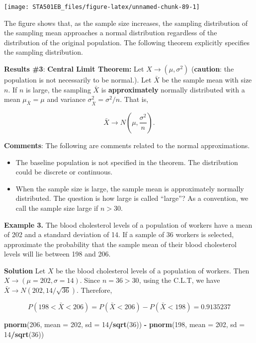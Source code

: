 \documentclass[
]{book}
\newenvironment{Shaded}{\begin{snugshade}}{\end{snugshade}}
\newcommand{\AttributeTok}[1]{\textcolor[rgb]{0.13,0.29,0.53}{#1}}
\newcommand{\DecValTok}[1]{\textcolor[rgb]{0.00,0.00,0.81}{#1}}
\newcommand{\FunctionTok}[1]{\textcolor[rgb]{0.13,0.29,0.53}{\textbf{#1}}}
\newcommand{\NormalTok}[1]{#1}
\newcommand{\SpecialCharTok}[1]{\textcolor[rgb]{0.81,0.36,0.00}{\textbf{#1}}}
\begin{document}
\begin{center}\texttt{[image: STA501EB\_files/figure-latex/unnamed-chunk-89-1]} \end{center}

The figure shows that, as the sample size increases, the sampling distribution of the sampling mean approaches a normal distribution regardless of the distribution of the original population. The following theorem explicitly specifies the sampling distribution.

\textbf{Results \#3}: \textbf{Central Limit Theorem:} Let \(X \to (\mu, \sigma^2)\) (\textbf{caution}: the population is not necessarily to be normal.). Let \(\bar{X}\) be the sample mean with size \(n\). If \(n\) is large, the sampling \(\bar{X}\) is \textbf{approximately} normally distributed with a mean \(\mu_{\bar{X}} = \mu\) and variance \(\sigma_{\bar{X}}^2 = \sigma^2/n\). That is,

\[
\bar{X} \to N\left( \mu, \frac{\sigma^2}{n} \right).
\]

\textbf{Comments}: The following are comments related to the normal approximations.

\begin{itemize}
\item
  The baseline population is not specified in the theorem. The distribution could be discrete or continuous.
\item
  When the sample size is large, the sample mean is approximately normally distributed. The question is how large is called ``large''? As a convention, we call the sample size large if \(n > 30\).
\end{itemize}

\textbf{Example 3.} The blood cholesterol levels of a population of workers have a mean of 202 and a standard deviation of 14. If a sample of 36 workers is selected, approximate the probability that the sample mean of their blood cholesterol levels will lie between 198 and 206.

\textbf{Solution} Let \(X\) be the blood cholesterol levels of a population of workers. Then \(X \to (\mu = 202, \sigma = 14)\). Since \(n=36 > 30\), using the C.L.T, we have \(\bar{X} \to N(202, 14/\sqrt{36})\). Therefore,

\[
P(198 < \bar{X} < 206) = P(\bar{X} < 206) - P(\bar{X} < 198) =0.9135237 
\]

\begin{Shaded}
\begin{Highlighting}[]
 \FunctionTok{pnorm}\NormalTok{(}\DecValTok{206}\NormalTok{, }\AttributeTok{mean =} \DecValTok{202}\NormalTok{, }\AttributeTok{sd =} \DecValTok{14}\SpecialCharTok{/}\FunctionTok{sqrt}\NormalTok{(}\DecValTok{36}\NormalTok{)) }\SpecialCharTok{{-}} \FunctionTok{pnorm}\NormalTok{(}\DecValTok{198}\NormalTok{, }\AttributeTok{mean =} \DecValTok{202}\NormalTok{, }\AttributeTok{sd =} \DecValTok{14}\SpecialCharTok{/}\FunctionTok{sqrt}\NormalTok{(}\DecValTok{36}\NormalTok{))}
\end{Highlighting}
\end{Shaded}
\end{document}
